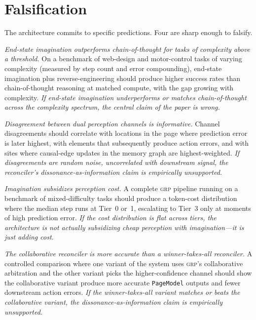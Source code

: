 \documentclass[12pt]{article}
\theoremstyle{definition}
\theoremstyle{remark}
\newcommand{\grp}{\textsc{grp}}
\begin{document}
\section{Falsification}
\label{sec:falsification}

The architecture commits to specific predictions. Four are sharp
enough to falsify.

\begin{description}[leftmargin=*]
\item[\textbf{F1.}] \emph{End-state imagination outperforms
  chain-of-thought for tasks of complexity above a threshold.} On a
  benchmark of web-design and motor-control tasks of varying
  complexity (measured by step count and error compounding), end-state
  imagination plus reverse-engineering should produce higher success
  rates than chain-of-thought reasoning at matched compute, with the
  gap growing with complexity. \emph{If end-state imagination
  underperforms or matches chain-of-thought across the complexity
  spectrum, the central claim of the paper is wrong.}

\item[\textbf{F2.}] \emph{Disagreement between dual perception
  channels is informative.} Channel disagreements should correlate
  with locations in the page where prediction error is later highest,
  with elements that subsequently produce action errors, and with
  sites where causal-edge updates in the memory graph are
  highest-weighted. \emph{If disagreements are random noise,
  uncorrelated with downstream signal, the reconciler's
  dissonance-as-information claim is empirically unsupported.}

\item[\textbf{F3.}] \emph{Imagination subsidizes perception cost.} A
  complete \grp{} pipeline running on a benchmark of mixed-difficulty
  tasks should produce a token-cost distribution where the median
  step runs at Tier~0 or~1, escalating to Tier~3 only at moments of
  high prediction error. \emph{If the cost distribution is flat across
  tiers, the architecture is not actually subsidizing cheap perception
  with imagination---it is just adding cost.}

\item[\textbf{F4.}] \emph{The collaborative reconciler is more
  accurate than a winner-takes-all reconciler.} A controlled
  comparison where one variant of the system uses \grp{}'s
  collaborative arbitration and the other variant picks the
  higher-confidence channel should show the collaborative variant
  produce more accurate \texttt{PageModel} outputs and fewer
  downstream action errors. \emph{If the winner-takes-all variant
  matches or beats the collaborative variant, the dissonance-as-information
  claim is empirically unsupported.}
\end{description}
\end{document}
